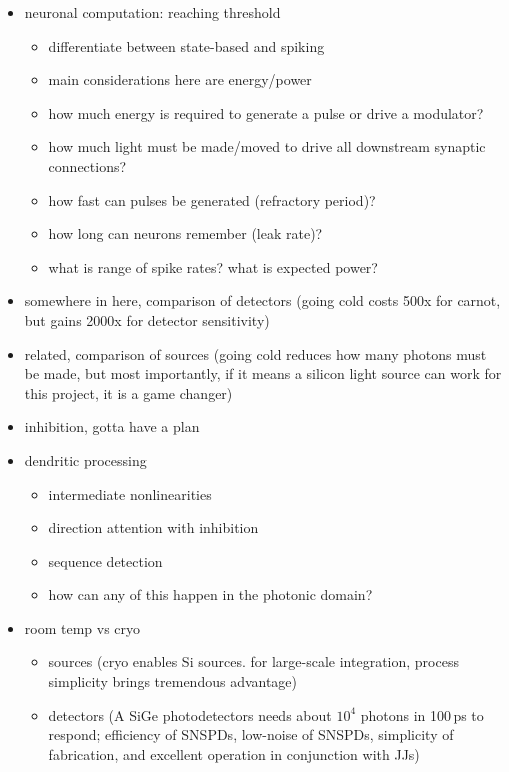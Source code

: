 \begin{itemize}
\item neuronal computation: reaching threshold
\begin{itemize}
\item differentiate between state-based and spiking
\item main considerations here are energy/power
\item how much energy is required to generate a pulse or drive a modulator? 
\item how much light must be made/moved to drive all downstream synaptic connections? 
\item how fast can pulses be generated (refractory period)? 
\item how long can neurons remember (leak rate)? 
\item what is range of spike rates? what is expected power?
\end{itemize}

\item somewhere in here, comparison of detectors (going cold costs 500x for carnot, but gains 2000x for detector sensitivity)
\item related, comparison of sources (going cold reduces how many photons must be made, but most importantly, if it means a silicon light source can work for this project, it is a game changer)

\item inhibition, gotta have a plan

\item dendritic processing
\begin{itemize}
\item intermediate nonlinearities
\item direction attention with inhibition
\item sequence detection
\item how can any of this happen in the photonic domain?
\end{itemize}

\item room temp vs cryo
\begin{itemize}
\item sources (cryo enables Si sources. for large-scale integration, process simplicity brings tremendous advantage)
\item detectors (A SiGe photodetectors needs about $10^4$ photons in 100\,ps to respond; efficiency of SNSPDs, low-noise of SNSPDs, simplicity of fabrication, and excellent operation in conjunction with JJs)

\end{itemize}

\end{itemize}

